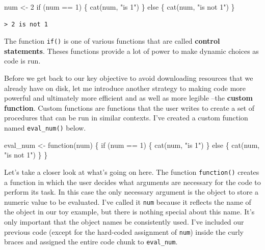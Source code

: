 \documentclass[
  letterpaper,
]{latex/krantz}
\newenvironment{Shaded}{\begin{snugshade}}{\end{snugshade}}
\newcommand{\ControlFlowTok}[1]{\textcolor[rgb]{0.00,0.00,0.00}{#1}}
\newcommand{\DecValTok}[1]{\textcolor[rgb]{0.00,0.00,0.00}{#1}}
\newcommand{\FunctionTok}[1]{\textcolor[rgb]{0.00,0.00,0.00}{#1}}
\newcommand{\NormalTok}[1]{\textcolor[rgb]{0.00,0.00,0.00}{#1}}
\newcommand{\OtherTok}[1]{\textcolor[rgb]{0.00,0.00,0.00}{#1}}
\newcommand{\SpecialCharTok}[1]{\textcolor[rgb]{0.00,0.00,0.00}{#1}}
\newcommand{\StringTok}[1]{\textcolor[rgb]{0.00,0.00,0.00}{#1}}
\begin{document}
\begin{Shaded}
\begin{Highlighting}[]
\NormalTok{num }\OtherTok{\textless{}{-}} \DecValTok{2}
\ControlFlowTok{if}\NormalTok{ (num }\SpecialCharTok{==} \DecValTok{1}\NormalTok{) \{}
  \FunctionTok{cat}\NormalTok{(num, }\StringTok{"is 1"}\NormalTok{)}
\NormalTok{\} }\ControlFlowTok{else}\NormalTok{ \{}
  \FunctionTok{cat}\NormalTok{(num, }\StringTok{"is not 1"}\NormalTok{)}
\NormalTok{\}}
\end{Highlighting}
\end{Shaded}

\begin{verbatim}
> 2 is not 1
\end{verbatim}

The function \texttt{if()} is one of various functions that are called
\textbf{control statements}. Theses functions provide a lot of power to
make dynamic choices as code is run.

Before we get back to our key objective to avoid downloading resources
that we already have on disk, let me introduce another strategy to
making code more powerful and ultimately more efficient and as well as
more legible --the \textbf{custom function}. Custom functions are
functions that the user writes to create a set of procedures that can be
run in similar contexts. I've created a custom function named
\texttt{eval\_num()} below.

\begin{Shaded}
\begin{Highlighting}[]
\NormalTok{eval\_num }\OtherTok{\textless{}{-}} \ControlFlowTok{function}\NormalTok{(num) \{}
  \ControlFlowTok{if}\NormalTok{ (num }\SpecialCharTok{==} \DecValTok{1}\NormalTok{) \{}
    \FunctionTok{cat}\NormalTok{(num, }\StringTok{"is 1"}\NormalTok{)}
\NormalTok{  \} }\ControlFlowTok{else}\NormalTok{ \{}
    \FunctionTok{cat}\NormalTok{(num, }\StringTok{"is not 1"}\NormalTok{)}
\NormalTok{  \}}
\NormalTok{\}}
\end{Highlighting}
\end{Shaded}

Let's take a closer look at what's going on here. The function
\texttt{function()} creates a function in which the user decides what
arguments are necessary for the code to perform its task. In this case
the only necessary argument is the object to store a numeric value to be
evaluated. I've called it \texttt{num} because it reflects the name of
the object in our toy example, but there is nothing special about this
name. It's only important that the object names be consistently used.
I've included our previous code (except for the hard-coded assignment of
\texttt{num}) inside the curly braces and assigned the entire code chunk
to \texttt{eval\_num}.
\end{document}
